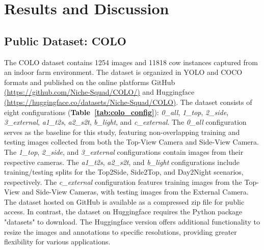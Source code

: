 \section{Results and Discussion}

\subsection*{Public Dataset: COLO}

The COLO dataset contains 1254 images and 11818 cow instances captured from an indoor farm environment. The dataset is organized in YOLO and COCO formats and published on the online platforms GitHub \href{https://github.com/Niche-Squad/COLO/}{(https://github.com/Niche-Squad/COLO/)} and Huggingface \href{https://huggingface.co/datasets/Niche-Squad/COLO}{(https://huggingface.co/datasets/Niche-Squad/COLO)}. The dataset consists of eight configurations (\textbf{Table~\ref{tab:colo_config}}):
\textit{0\_all}, \textit{1\_top}, \textit{2\_side}, \textit{3\_external}, \textit{a1\_t2s}, \textit{a2\_s2t}, \textit{b\_light}, and \textit{c\_external}. The \textit{0\_all} configuration serves as the baseline for this study, featuring non-overlapping training and testing images collected from both the Top-View Camera and Side-View Camera. The \textit{1\_top}, \textit{2\_side}, and \textit{3\_external} configurations contain images from their respective cameras. The \textit{a1\_t2s}, \textit{a2\_s2t}, and \textit{b\_light} configurations include training/testing splits for the Top2Side, Side2Top, and Day2Night scenarios, respectively. The \textit{c\_external} configuration features training images from the Top-View and Side-View Cameras, with testing images from the External Camera. The dataset hosted on GitHub is available as a compressed zip file for public access. In contrast, the dataset on Huggingface requires the Python package "datasets" \cite{datasets} to download. The Huggingface version offers additional functionality to resize the images and annotations to specific resolutions, providing greater flexibility for various applications.

